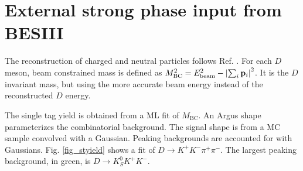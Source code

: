 \documentclass[12pt, a4paper, notitlepage, onecolumn]{article}
\begin{document}
\section{External strong phase input from BESIII}
\noindent The reconstruction of charged and neutral particles follows Ref. \cite{cite_KSKKAnalysis}. For each $D$ meson, beam constrained mass is defined as $M_\text{BC}^2 = E_\text{beam}^2 - \abs{\sum_i\vb{p}_i}^2$. It is the $D$ invariant mass, but using the more accurate beam energy instead of the reconstructed $D$ energy.

The single tag yield is obtained from a ML fit of $M_\text{BC}$. An Argus shape parameterizes the combinatorial background. The signal shape is from a MC sample convolved with a Gaussian. Peaking backgrounds are accounted for with Gaussians. Fig. \ref{fig_styield} shows a fit of $D\to K^+K^-\pi^+\pi^-$. The largest peaking background, in green, is $D\to K_S^0K^+K^-$.
\end{document}
